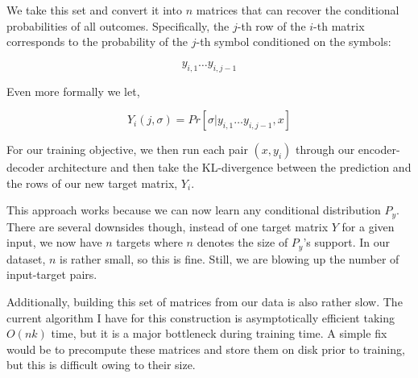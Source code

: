 \documentclass[12pt]{article}
\begin{document}
We take this set and convert it into $n$ matrices that can recover the
conditional probabilities of all outcomes. Specifically, the $j$-th
row of the $i$-th matrix corresponds to the probability of the $j$-th
symbol conditioned on the symbols:

$$y_{i, 1}\ldots y_{i, j-1}$$

Even more formally we let,

$$Y_i(j, \sigma) = Pr[\sigma | y_{i, 1} \ldots y_{i, j-1}, x]$$

For our training objective, we then run each pair $(x, y_i)$ through
our encoder-decoder architecture and then take the KL-divergence
between the prediction and the rows of our new target matrix, $Y_i$.

This approach works because we can now learn any conditional
distribution $P_y$. There are several downsides though, instead of one
target matrix $Y$ for a given input, we now have $n$ targets where $n$
denotes the size of $P_y$'s support. In our dataset, $n$ is rather
small, so this is fine. Still, we are blowing up the number of
input-target pairs.

Additionally, building this set of matrices from our data is also
rather slow. The current algorithm I have for this construction is
asymptotically efficient taking $O(nk)$ time, but it is a major
bottleneck during training time. A simple fix would be to precompute
these matrices and store them on disk prior to training, but this is
difficult owing to their size.
\end{document}
